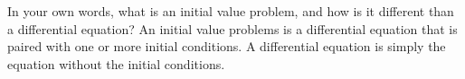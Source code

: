 {
In your own words, what is an initial value problem, and how is it different than a differential equation?
}
{
An initial value problems is a differential equation that is paired with one or more initial conditions. A differential equation is simply the equation without the initial conditions.
}
